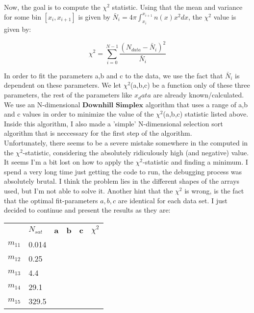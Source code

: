 Now, the goal is to compute the $\chi^2$ statistic. Using that the mean and variance for some bin $[x_i,x_{i+1}]$ is given by $\bar{N}_{i} = 4 \pi \int_{x_{i}}^{x_{i+1}} n(x) x^2 dx$, the $\chi^2$ value is given by:

\begin{equation}	
	\chi^2 = \sum_{i=0}^{N-1} \frac{(N_{data} - \bar{N}_{i})^2}{\bar{N}_{i}}
\end{equation}

In order to fit the parameters a,b and c to the data, we use the fact that $\bar{N}_{i}$ is dependent on these parameters. We let $\chi^2$(a,b,c) be a function only of these three parameters, the rest of the parameters like $x_data$ are already known/calculated. We use an N-dimensional $\textbf{Downhill Simplex}$ algorithm that uses a range of a,b and c values in order to minimize the value of the $\chi^2$(a,b,c) statistic listed above. Inside this algorithm, I also made a 'simple' N-dimensional selection sort algorithm that is neccessary for the first step of the algorithm.\\

Unfortunately, there seems to be a severe mistake somewhere in the computed in the $\chi^2$-statistic, considering the absolutely ridiculously high (and negative) value. It seems I'm a bit lost on how to apply the $\chi^2$-statistic and finding a minimum. I spend a very long time just getting the code to run, the debugging process was absolutely brutal. I think the problem lies in the different shapes of the arrays used, but I'm not able to solve it. Another hint that the $\chi^2$ is wrong, is the fact that the optimal fit-parameters $a,b,c$ are identical for each data set. I just decided to continue and present the results as they are:

\begin{table}[!h]
\begin{tabular}{llllll}
\textbf{} & \textbf{$N_{sat}$} & \textbf{a} & \textbf{b} & \textbf{c} & \textbf{$\chi^{2}$} \\
\textbf{$m_{11}$} &    0.014       &           &           &           &           \\
\textbf{$m_{12}$} &     0.25      &           &           &           &           \\
\textbf{$m_{13}$} &     4.4      &           &           &           &           \\
\textbf{$m_{14}$} &      29.1     &           &           &           &           \\
\textbf{$m_{15}$} &       329.5    &           &           &           &          
\end{tabular}
\end{table}

